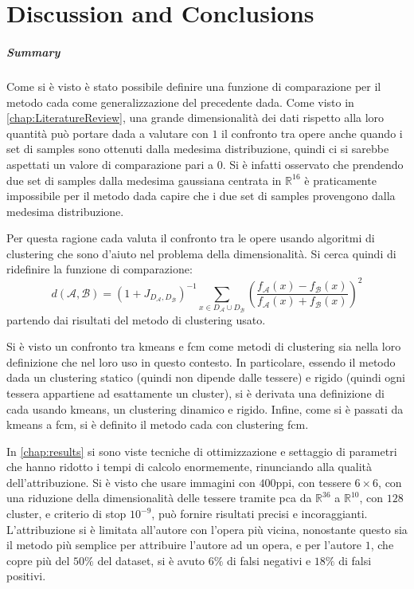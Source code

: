 \chapter{Discussion and Conclusions}

\paragraph{Summary}
Come si è visto è stato possibile definire una funzione di comparazione per il metodo \gls{cada} come generalizzazione del precedente \gls{dada}. Come visto in \cref{chap:LiteratureReview}, una grande dimensionalità dei dati rispetto alla loro quantità può portare \gls{dada} a valutare con $1$ il confronto tra opere anche quando i set di samples sono ottenuti dalla medesima distribuzione, quindi ci si sarebbe aspettati un valore di comparazione pari a $0$. Si è infatti osservato che prendendo due set di samples dalla medesima gaussiana centrata in $\mathbb{R}^{16}$ è praticamente impossibile per il metodo \gls{dada} capire che i due set di samples provengono dalla medesima distribuzione.

\noindent Per questa ragione \gls{cada} valuta il confronto tra le opere usando algoritmi di clustering che sono d'aiuto nel problema della dimensionalità. Si cerca quindi di ridefinire la funzione di comparazione:
\[
	d\left(\mathcal{A}, \mathcal{B}\right) = \left(1+J_{D_\mathcal{A}, D_\mathcal{B}}\right)^{-1}\sum_{x\in D_\mathcal{A}\cup D_\mathcal{B}}\left(\frac{f_\mathcal{A}(x) - f_\mathcal{B}(x)}{f_\mathcal{A}(x) + f_\mathcal{B}(x)}\right)^2
\]
partendo dai risultati del metodo di clustering usato.

\noindent Si è visto un confronto tra \gls{kmeans} e \gls{fcm} come metodi di clustering sia nella loro definizione che nel loro uso in questo contesto. In particolare, essendo il metodo \gls{dada} un clustering statico (quindi non dipende dalle tessere) e rigido (quindi ogni tessera appartiene ad esattamente un cluster), si è derivata una definizione di \gls{cada} usando \gls{kmeans}, un clustering dinamico e rigido. Infine, come si è passati da \gls{kmeans} a \gls{fcm}, si è definito il metodo \gls{cada} con clustering \gls{fcm}.

\noindent In \cref{chap:results} si sono viste tecniche di ottimizzazione e settaggio di parametri che hanno ridotto i tempi di calcolo enormemente, rinunciando alla qualità dell'attribuzione. Si è visto che usare immagini con $400$\gls{ppi}, con tessere $6\times6$, con una riduzione della dimensionalità delle tessere tramite \gls{pca} da $\mathbb{R}^{36}$ a $\mathbb{R}^{10}$, con $128$ cluster, e criterio di stop $10^{-9}$, può fornire risultati precisi e incoraggianti. L'attribuzione si è limitata all'autore con l'opera più vicina, nonostante questo sia il metodo più semplice per attribuire l'autore ad un opera, e per l'autore $1$, che copre più del $50\%$ del dataset, si è avuto $6\%$ di falsi negativi e $18\%$ di falsi positivi.

